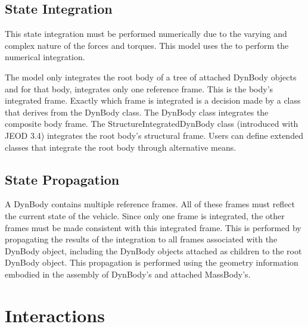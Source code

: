 \subsection*{State Integration}
This state integration must be performed numerically due to the varying and
complex nature of the forces and torques. This model uses the \INTEGRATION to
perform the numerical integration.

The model only integrates the root body of a tree of attached DynBody objects
and for that body, integrates only one reference frame. This is the body's
integrated frame. Exactly which frame is integrated is a decision made by a
class that derives from the DynBody class. The DynBody class integrates the composite body frame.
The StructureIntegratedDynBody class (introduced with JEOD 3.4) integrates the
root body's structural frame.
Users can define extended
classes that integrate the root body through alternative means.

\subsection*{State Propagation}
A DynBody contains multiple reference frames. All of these frames must reflect
the current state of the vehicle. Since only one frame is integrated, the other
frames must be made consistent with this integrated frame. This is performed
by propagating the results of the integration to all frames associated
with the DynBody object, including the DynBody objects attached as children
to the root DynBody object. This propagation is performed using the geometry
information embodied in the assembly of DynBody's and attached MassBody's.

\section*{Interactions}

